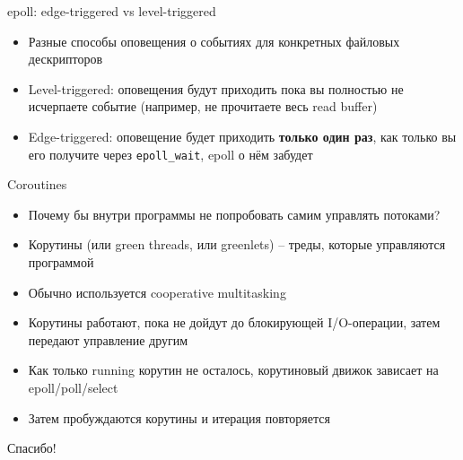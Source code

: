 \documentclass[10pt,pdf,hyperref={unicode}]{beamer}
\begin{document}
\begin{frame}{epoll: edge-triggered vs level-triggered}
\begin{itemize}
    \item Разные способы оповещения о событиях для конкретных файловых дескрипторов
    \item Level-triggered: оповещения будут приходить пока вы полностью не исчерпаете событие (например, не прочитаете весь read buffer)
    \item Edge-triggered: оповещение будет приходить \textbf{только один раз}, как только вы его получите через \texttt{epoll_wait}, epoll о нём забудет
\end{itemize}
\end{frame}

\begin{frame}{Coroutines}
\begin{itemize}
    \item Почему бы внутри программы не попробовать самим управлять потоками?
    \item Корутины (или green threads, или greenlets) -- треды, которые управляются программой
    \item Обычно используется cooperative multitasking
    \item Корутины работают, пока не дойдут до блокирующей I/O-операции, затем передают управление другим
    \item Как только running корутин не осталось, корутиновый движок зависает на epoll/poll/select
    \item Затем пробуждаются корутины и итерация повторяется
\end{itemize}
\end{frame}

\begin{frame}
\center\Huge{Спасибо!}
\end{frame}
\end{document}
